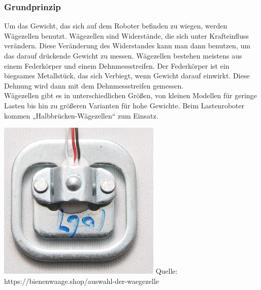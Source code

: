 \documentclass[ngerman,12pt,a4paper]{article}
\begin{document}
		\subsubsection{Grundprinzip}
		Um das Gewicht, das sich auf dem Roboter befinden zu wiegen, werden Wägezellen benutzt. Wägezellen sind Widerstände, die sich unter Krafteinfluss verändern. Diese Veränderung des Widerstandes kann man dann benutzen, um das darauf drückende Gewicht zu messen. Wägezellen bestehen meistens aus einem Federkörper und einem Dehnmessstreifen. Der Federkörper ist ein biegsames Metallstück, das sich Verbiegt, wenn Gewicht darauf einwirkt. Diese Dehnung wird dann mit dem Dehnmessstreifen gemessen. \\ [0.2cm]
		Wägezellen gibt es in unterschiedlichen Größen, von kleinen Modellen für geringe Lasten bis hin zu größeren Varianten für hohe Gewichte. Beim Lastenroboter kommen „Halbbrücken-Wägezellen“ zum Einsatz. 
		\begin{center}
			\begin{minipage}{0.5\textwidth}
				\centering
				\includegraphics[width=\textwidth]{Pictures/halb_waegezellen}
				\label{fig:halb_waegezellen}
				\vspace{-3pt}
				{\small Quelle: {https://bienenwaage.shop/auswahl-der-waegezelle}}
			\end{minipage}
		\end{center}
\end{document}
